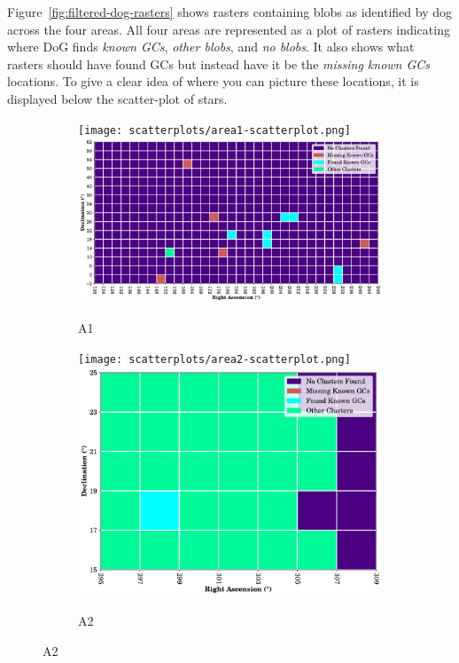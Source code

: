 Figure~\ref{fig:filtered-dog-rasters} shows rasters containing blobs as identified by dog across the four areas. All four areas are represented as a plot of rasters indicating where DoG finds \textit{known GCs}, \textit{other blobs}, and \textit{no blobs}. It also shows what rasters should have found GCs but instead have it be the \textit{missing known GCs} locations. To give a clear idea of where you can picture these locations, it is displayed below the scatter-plot of stars.
\begin{figure}[H]
    \centering

    \begin{subfigure}[b]{0.49\textwidth}
        \texttt{[image: scatterplots/area1-scatterplot.png]}
        \includegraphics[height=0.6\textwidth]{./figures/rasters/grids/grid-dog-a1.pdf}
        \caption{A1}
        \label{fig:a1-dog-overview}
    \end{subfigure}
    \begin{subfigure}[b]{0.49\textwidth}
        \texttt{[image: scatterplots/area2-scatterplot.png]}
        \includegraphics[height=0.6\textwidth]{./figures/rasters/grids/grid-dog-a2.pdf}
        \caption{A2}
        \label{fig:a2-dog-overview}
    \end{subfigure}


\end{figure}
